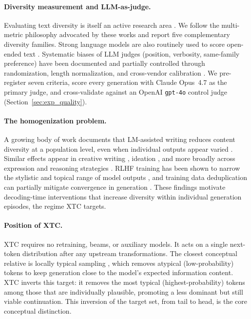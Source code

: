 \documentclass{article}
\newcommand{\xtc}{\textsc{XTC}}
\begin{document}
\paragraph{Diversity measurement and LLM-as-judge.}
Evaluating text diversity is itself an active research area \citep{shaib2024diversity, shaib2024templates, zhu2018texygen, papineni2002bleu, pillutla2021mauve, zhang2020bertscore, hashimoto2019unifying}.
We follow the multi-metric philosophy advocated by these works and report five complementary diversity families.
Strong language models are also routinely used to score open-ended text \citep{zheng2023judging, chiang2023closer, li2024leveraging}.
Systematic biases of LLM judges (position, verbosity, same-family preference) have been documented and partially controlled through randomization, length normalization, and cross-vendor calibration \citep{dubois2024length, wang2024pandalm}.
We pre-register seven criteria, score every generation with Claude Opus~4.7 as the primary judge, and cross-validate against an OpenAI \texttt{gpt-4o} control judge (Section~\ref{sec:exp_quality}).

\paragraph{The homogenization problem.}
A growing body of work documents that LM-assisted writing reduces content diversity at a population level, even when individual outputs appear varied \citep{padmakumar2024contentdiversity}.
Similar effects appear in creative writing \citep{doshi2024generative}, ideation \citep{anderson2024homogenization}, and more broadly across expression and reasoning strategies \citep{sourati2025homogenizing}.
RLHF training has been shown to narrow the stylistic and topical range of model outputs \citep{kirk2024understanding, ouyang2022training, bai2022training}, and training data deduplication can partially mitigate convergence in generation \citep{lee2022deduplicating}.
These findings motivate decoding-time interventions that increase diversity within individual generation episodes, the regime \xtc{} targets.

\paragraph{Position of \xtc{}.}
\xtc{} requires no retraining, beams, or auxiliary models.
It acts on a single next-token distribution after any upstream transformations.
The closest conceptual relative is locally typical sampling \citep{meister2023typical}, which removes atypical (low-probability) tokens to keep generation close to the model's expected information content.
\xtc{} inverts this target: it removes the most typical (highest-probability) tokens among those that are individually plausible, promoting a less dominant but still viable continuation.
This inversion of the target set, from tail to head, is the core conceptual distinction.
\end{document}
